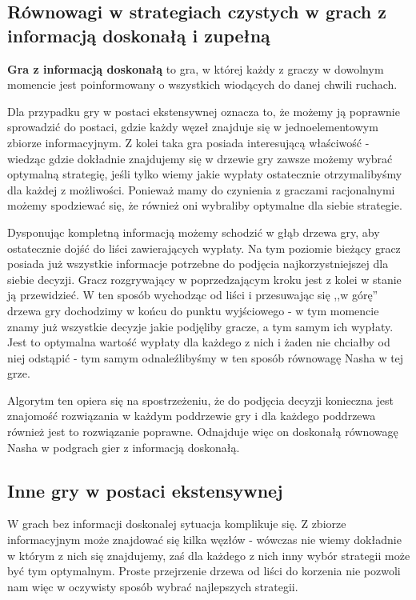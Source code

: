 \documentclass[polish]{standalone}
\begin{document}
\subsection{Równowagi w strategiach czystych w grach z informacją doskonałą i zupełną}

\begin{definition}
\textbf{Gra z informacją doskonałą} to gra, w której każdy z graczy w dowolnym momencie jest poinformowany o wszystkich
wiodących do danej chwili ruchach.
\end{definition}

Dla przypadku gry w postaci ekstensywnej oznacza to, że możemy ją poprawnie sprowadzić do postaci, gdzie każdy węzeł
znajduje się w jednoelementowym zbiorze informacyjnym. Z kolei taka gra posiada interesującą właściwość - wiedząc gdzie
dokładnie znajdujemy się w drzewie gry zawsze możemy wybrać optymalną strategię, jeśli tylko wiemy jakie wypłaty
ostatecznie otrzymalibyśmy dla każdej z możliwości. Ponieważ mamy do czynienia z graczami racjonalnymi możemy spodziewać
się, że również oni wybraliby optymalne dla siebie strategie.

Dysponując kompletną informacją możemy schodzić w głąb drzewa gry, aby ostatecznie dojść do liści zawierających wypłaty.
Na tym poziomie bieżący gracz posiada już wszystkie informacje potrzebne do podjęcia najkorzystniejszej dla siebie
decyzji. Gracz rozgrywający w poprzedzającym kroku jest z kolei w stanie ją przewidzieć. W ten sposób wychodząc od liści
i przesuwając się ,,w górę'' drzewa gry dochodzimy w końcu do punktu wyjściowego - w tym momencie znamy już wszystkie
decyzje jakie podjęliby gracze, a tym samym ich wypłaty. Jest to optymalna wartość wypłaty dla każdego z nich i żaden
nie chciałby od niej odstąpić - tym samym odnaleźlibyśmy w ten sposób równowagę Nasha w tej grze.

Algorytm ten opiera się na spostrzeżeniu, że do podjęcia decyzji konieczna jest znajomość rozwiązania w każdym
poddrzewie gry i dla każdego poddrzewa również jest to rozwiązanie poprawne. Odnajduje więc on doskonałą równowagę
Nasha w podgrach gier z informacją doskonałą.

\subsection{Inne gry w postaci ekstensywnej}

W grach bez informacji doskonalej sytuacja komplikuje się. Z zbiorze informacyjnym może znajdować się kilka węzłów -
wówczas nie wiemy dokładnie w którym z nich się znajdujemy, zaś dla każdego z nich inny wybór strategii może być tym
optymalnym. Proste przejrzenie drzewa od liści do korzenia nie pozwoli nam więc w oczywisty sposób wybrać najlepszych
strategii.
\end{document}
